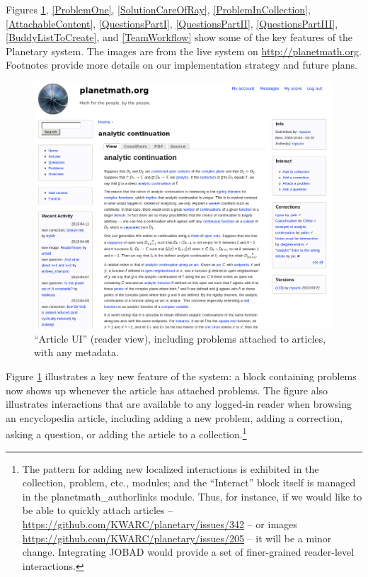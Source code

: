 
Figures \ref{ReaderView}, \ref{ProblemOne}, \ref{SolutionCareOfRay},
\ref{ProblemInCollection}, \ref{AttachableContent},
\ref{QuestionsPartI}, \ref{QuestionsPartII}, \ref{QuestionsPartIII},
\ref{BuddyListToCreate}, 
and \ref{TeamWorkflow}
show some of the key features of the Planetary system. The images are from the live system on \url{http://planetmath.org}. Footnotes provide more details on our implementation strategy and future plans.

\newpage
\FloatBarrier

\begin{vplace}[0.7]
\begin{figure}[h]
\begin{center}
\includegraphics[width=.85\textwidth]{./inputs/ReaderView.png}
\end{center}
\caption{``Article UI'' (reader view), including problems attached to
  articles, with any metadata. \label{ReaderView}}
\end{figure}
\bigskip

Figure \ref{ReaderView} illustrates a key new feature of the system:
a block containing problems now shows up whenever the article has
attached problems.  The figure also illustrates interactions that are
available to any logged-in reader when browsing an encyclopedia
article, including adding a new problem, adding a correction, asking a
question, or adding the article to a collection.\footnote{The pattern
  for adding new localized interactions is exhibited in the {\sfdefault
    collection}, {\sfdefault problem}, etc., modules; and the ``Interact''
  block itself is managed in the {\sfdefault planetmath\_authorlinks}
  module. Thus, for instance, if we would like to be able to quickly
  attach articles --
  \url{https://github.com/KWARC/planetary/issues/342} -- or images
  \url{https://github.com/KWARC/planetary/issues/205} -- it will be a
  minor change.  Integrating JOBAD would provide a set of finer-grained
  reader-level interactions.}

\end{vplace}

